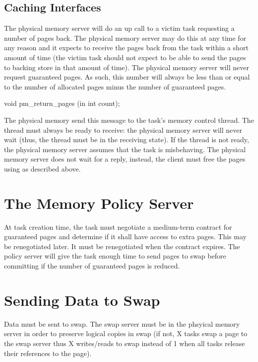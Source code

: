 \subsection{Caching Interfaces}

The physical memory server will do an up call to a victim task
requesting a number of pages back.  The physical memory server may do
this at any time for any reason and it expects to receive the pages
back from the task within a short amount of time (the victim task
should not expect to be able to send the pages to backing store in
that amount of time).  The physical memory server will never request
guaranteed pages.  As such, this number will always be less than or
equal to the number of allocated pages minus the number of guaranteed
pages.

\begin{code}
void pm_return_pages (in int count);
\end{code}

The physical memory send this message to the task's memory control
thread.  The thread must always be ready to receive: the physical
memory server will never wait (thus, the thread must be in the
receiving state).  If the thread is not ready, the physical memory
server assumes that the task is misbehaving.  The physical memory
server does not wait for a reply, instead, the client must free the
pages using  as described above.

\section{The Memory Policy Server}

At task creation time, the task must negotiate a medium-term contract
for guaranteed pages and determine if it shall have access to extra
pages.  This may be renegotiated later.  It must be renegotiated when
the contract expires.  The policy server will give the task enough
time to send pages to swap before committing if the number of
guaranteed pages is reduced.

\section{Sending Data to Swap}

Data must be sent to swap.  The swap server must be in the phsyical
memory server in order to preserve logical copies in swap (if not, X
tasks swap a page to the swap server thus X writes/reads to swap
instead of 1 when all tasks release their references to the page).

